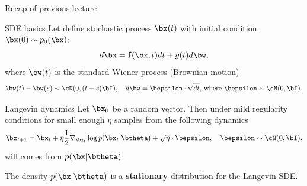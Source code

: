 \begin{frame}{Recap of previous lecture}
	\vspace{-0.2cm}
	\begin{block}{SDE basics}
		Let define stochastic process $\bx(t)$ with initial condition $\bx(0) \sim p_0(\bx)$:
		\[
			d\bx = \mathbf{f}(\bx, t) dt + g(t) d \bw, 
		\]
		where $\bw(t)$ is the standard Wiener process (Brownian motion)
		\vspace{-0.2cm}
		\[		
			\bw(t) - \bw(s) \sim \cN(0, (t - s) \bI), \quad d \bw = \bepsilon \cdot \sqrt{dt}, \, \text{where } \bepsilon \sim \cN(0, \bI).
		\]
	\end{block}
	\vspace{-0.5cm}
	\begin{block}{Langevin dynamics}
		Let $\bx_0$ be a random vector. Then under mild regularity conditions for small enough $\eta$ samples from the following dynamics
		\vspace{-0.2cm}
		\[
			\bx_{t + 1} = \bx_t + \eta \frac{1}{2} \nabla_{\bx_t} \log p(\bx_t | \btheta) + \sqrt{\eta} \cdot \bepsilon, \quad \bepsilon \sim \cN(0, \bI).
		\]
		will comes from $p(\bx | \btheta)$.
	\end{block}
	The density $p(\bx | \btheta)$ is a \textbf{stationary} distribution for the Langevin SDE.
\end{frame}
